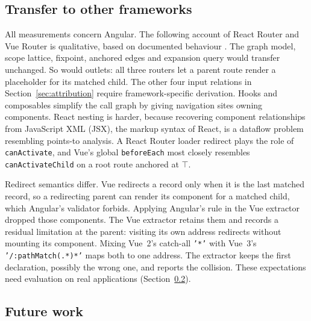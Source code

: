 \subsection{Transfer to other frameworks}
\label{sec:transfer}

All measurements concern Angular. The following account of React Router and Vue Router is
qualitative, based on documented behaviour \cite{reactrouterdocs,vuerouterdocs}. The graph model,
scope lattice, fixpoint, anchored edges and expansion query would transfer unchanged. So would
outlets: all three routers let a parent route render a placeholder for its matched child. The
other four input relations in Section~\ref{sec:attribution} require framework-specific derivation.
Hooks and composables simplify the call graph by giving navigation sites owning components. React
nesting is harder, because recovering component relationships from JavaScript XML (JSX), the markup
syntax of React, is a dataflow problem resembling points-to analysis. A React Router loader redirect
plays the role of \texttt{canActivate}, and Vue's global \texttt{beforeEach} most closely resembles
\texttt{canActivateChild} on a root route anchored at $\top$.

Redirect semantics differ. Vue redirects a record only when it is the last matched record, so a
redirecting parent can render its component for a matched child, which Angular's validator forbids.
Applying Angular's rule in the Vue extractor dropped those components. The Vue extractor retains
them and records a residual limitation at the parent: visiting its own address redirects without
mounting its component. Mixing Vue~2's catch-all \texttt{'*'} with Vue~3's
\texttt{'/:pathMatch(.*)*'} maps both to one address. The extractor keeps the first declaration,
possibly the wrong one, and reports the collision. These expectations need evaluation on real
applications (Section~\ref{sec:future}).

\subsection{Future work}
\label{sec:future}

